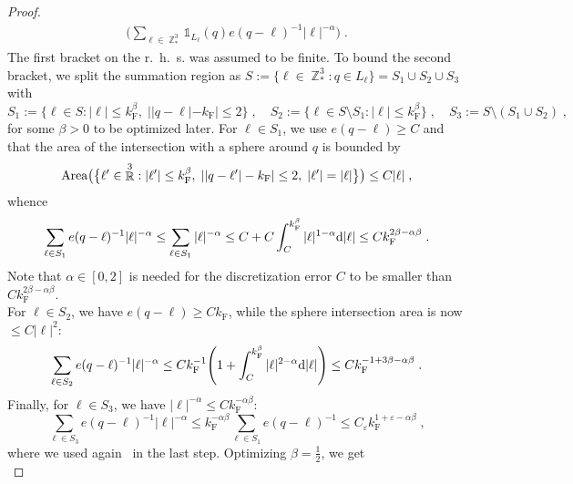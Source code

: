 \documentclass[12pt,a4paper]{article}
\numberwithin{equation}{section}
\newcommand{\1}{\mathbb{I}}
\newcommand{\di}{\textnormal{d}}
\newcommand{\F}{\mathrm{F}}
\DeclareMathOperator{\R}{\mathbb{R}}
\DeclareMathOperator{\Z}{\mathbb{Z}}
\theoremstyle{plain}
\theoremstyle{definition}
\theoremstyle{remark}
\theoremstyle{plain}
\theoremstyle{definition}
\theoremstyle{remark}
\begin{document}
\begin{proof}
\begin{equation}
\begin{aligned}
		\Bigg( \sum_{\ell \in \Z^3_*} \mathds{1}_{L_\ell}(q) e(q-\ell)^{-1} |\ell|^{-\alpha} \Bigg) \;.
\end{aligned}
\end{equation}
The first bracket on the r.~h.~s. was assumed to be finite. To bound the second bracket, we split the summation region as $ S := \{ \ell \in \Z^3_* : q \in L_\ell \} = S_1 \cup S_2 \cup S_3 $ with
\begin{equation}
	S_1 := \{ \ell \in S : |\ell| \le k_{\F}^\beta, \; ||q-\ell|-k_{\F}| \le 2 \} \;, \quad
	S_2 := \{ \ell \in S \setminus S_1 : |\ell| \le k_{\F}^\beta \} \;, \quad
	S_3 := S \setminus (S_1 \cup S_2) \;,
\end{equation}
for some $ \beta > 0 $ to be optimized later. For $ \ell \in S_1 $, we use $ e(q-\ell) \ge C $ and that the area of the intersection with a sphere around $ q $ is bounded by
\begin{equation*}
	\textnormal{Area} \big( \big\{ \ell' \in \R^3 : |\ell'| \le k_{\F}^\beta, \; ||q-\ell'|-k_{\F}| \le 2, \; |\ell'| = |\ell| \big\} \big)
	\leq C |\ell| \;,
\end{equation*}
whence
\begin{equation}
	\sum_{\ell \in S_1} e(q-\ell)^{-1} |\ell|^{-\alpha}
	\leq \sum_{\ell \in S_1} |\ell|^{-\alpha}
	\leq C + C \int_C^{k_{\F}^\beta} |\ell|^{1-\alpha}  \di |\ell|
	\le C k_{\F}^{2 \beta - \alpha \beta} \;.
\end{equation}
Note that $ \alpha \in [0,2] $ is needed for the discretization error $ C $ to be smaller than $C k_{\F}^{2 \beta - \alpha \beta} $.\\
For $ \ell \in S_2 $, we have $ e(q-\ell) \ge C k_{\F} $, while the sphere intersection area is now $ \leq C |\ell|^2 $:
\begin{equation}
	\sum_{\ell \in S_2} e(q-\ell)^{-1} |\ell|^{-\alpha}
	\leq C k_{\F}^{-1} \Bigg( 1 + \int_C^{k_{\F}^\beta} |\ell|^{2-\alpha} \di |\ell| \Bigg)
	\le C k_{\F}^{-1 + 3 \beta - \alpha \beta} \;.
\end{equation}
Finally, for $ \ell \in S_3 $, we have $ |\ell|^{-\alpha} \le C k_{\F}^{-\alpha \beta} $:
\begin{equation}
	\sum_{\ell \in S_3} e(q-\ell)^{-1} |\ell|^{-\alpha}
	\le k_{\F}^{-\alpha \beta} \sum_{\ell \in S_1} e(q-\ell)^{-1}
	\le C_\varepsilon k_{\F}^{1 + \varepsilon - \alpha \beta} \;,
\end{equation}
where we used again~\cite[Lemma~3.2]{CHN24} in the last step. Optimizing $ \beta = \frac 12 $, we get
\begin{equation}

\end{equation}
\end{proof}
\end{document}
